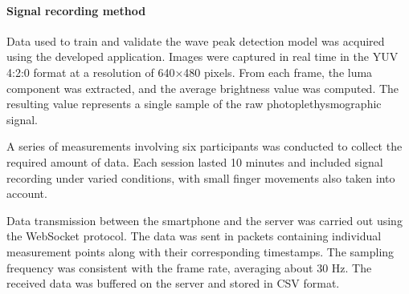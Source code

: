 \documentclass[journal]{IEEEtran}
\begin{document}
\paragraph{Signal recording method}
Data used to train and validate the wave peak detection model was acquired using the developed application. Images were captured in real time in the YUV 4:2:0 format at a resolution of 640×480 pixels. From each frame, the luma component was extracted, and the average brightness value was computed. The resulting value represents a single sample of the raw photoplethysmographic signal.

A series of measurements involving six participants was conducted to collect the required amount of data. Each session lasted 10 minutes and included signal recording under varied conditions, with small finger movements also taken into account.

Data transmission between the smartphone and the server was carried out using the WebSocket protocol. The data was sent in packets containing individual measurement points along with their corresponding timestamps. The sampling frequency was consistent with the frame rate, averaging about 30 Hz. The received data was buffered on the server and stored in CSV format.

\end{document}
